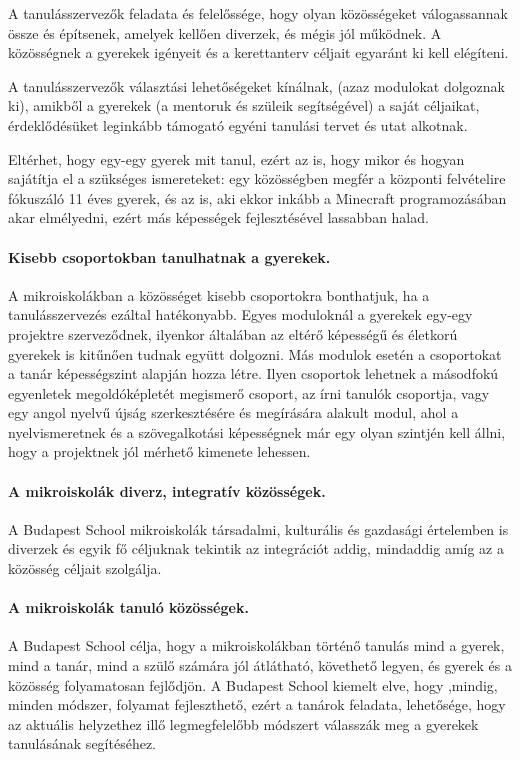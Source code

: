 A tanulásszervezők feladata és felelőssége, hogy olyan közösségeket
válogassannak össze és építsenek, amelyek kellően diverzek, és mégis jól
működnek. A közösségnek a gyerekek igényeit és a kerettanterv céljait egyaránt
ki kell elégíteni.

A tanulásszervezők választási lehetőségeket kínálnak, (azaz modulokat dolgoznak
ki), amikből a gyerekek (a mentoruk és szüleik segítségével) a saját céljaikat,
érdeklődésüket leginkább támogató egyéni tanulási tervet és utat alkotnak.

Eltérhet, hogy egy-egy gyerek mit tanul, ezért az is, hogy mikor és hogyan
sajátítja el a szükséges ismereteket: egy közösségben megfér a központi
felvételire fókuszáló 11 éves gyerek, és az is, aki ekkor inkább a Minecraft
programozásában akar elmélyedni, ezért más képességek fejlesztésével lassabban
halad.

\paragraph{Kisebb csoportokban tanulhatnak a gyerekek.}
A mikroiskolákban a közösséget kisebb csoportokra bonthatjuk, ha a
tanulásszervezés ezáltal hatékonyabb. Egyes moduloknál a gyerekek egy-egy
projektre szerveződnek, ilyenkor általában az eltérő képességű és életkorú
gyerekek is kitűnően tudnak együtt dolgozni. Más modulok esetén a csoportokat a
tanár képességszint alapján hozza létre. Ilyen csoportok lehetnek a másodfokú
egyenletek megoldóképletét megismerő csoport, az írni tanulók csoportja, vagy
egy angol nyelvű újság szerkesztésére és megírására alakult modul, ahol a
nyelvismeretnek és a szövegalkotási képességnek már egy olyan szintjén kell
állni, hogy a projektnek jól mérhető kimenete lehessen.

\paragraph{A mikroiskolák diverz, integratív közösségek.}
A Budapest School mikroiskolák társadalmi, kulturális és gazdasági értelemben
is diverzek és egyik fő céljuknak tekintik az integrációt addig, mindaddig amíg
az a közösség céljait szolgálja.

\paragraph{A mikroiskolák tanuló közösségek.}
A Budapest School célja, hogy a mikroiskolákban történő tanulás mind a gyerek,
mind a tanár, mind a szülő számára jól átlátható, követhető legyen, és gyerek
és a közösség folyamatosan fejlődjön.
A Budapest School kiemelt elve, hogy ,mindig, minden módszer, folyamat
fejleszthető, ezért a tanárok feladata, lehetősége, hogy az aktuális helyzethez
illő legmegfelelőbb módszert válasszák meg a gyerekek tanulásának segítéséhez.

